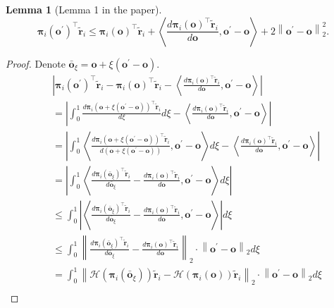 \documentclass[10pt]{article}
\def\rvo{{\mathbf{o}}}
\def\rvo{{\mathbf{o}}}
\def\rvtilder{{\tilde{\mathbf{r}}}}
\newtheorem{lem}{Lemma}
\def\rvpi{{\boldsymbol{\pi}}}
\def\gH{{\mathcal{H}}}
\begin{document}
\begin{lem}[Lemma 1 in the paper]
\label{lem:logit_smoothness}
\begin{equation*}
    \rvpi_i\left( \rvo^\prime \right)^\top \rvtilder_i \le \rvpi_i\left( \rvo \right)^\top \rvtilder_i + \left\langle \frac{d \rvpi_i\left( \rvo \right)^\top \rvtilder_i}{d \rvo}, \rvo^\prime - \rvo \right\rangle + 2 \left\| \rvo^\prime - \rvo \right\|_2^2.
\end{equation*}
\end{lem}
\begin{proof}
Denote $\bar{\rvo}_{\xi} = \rvo + \xi \left( \rvo^\prime - \rvo \right)$.
\begin{equation*}
\begin{split}
    &\left| \rvpi_i\left( \rvo^\prime \right)^\top \rvtilder_i - \rvpi_i\left( \rvo \right)^\top \rvtilder_i - \left\langle \frac{d \rvpi_i\left( \rvo \right)^\top \rvtilder_i}{d \rvo}, \rvo^\prime - \rvo \right\rangle \right| \\
    &= \left| \int_0^1{ \frac{d \rvpi_i\left( \rvo + \xi \left( \rvo^\prime - \rvo \right) \right)^\top \rvtilder_i}{d \xi} d\xi} - \left\langle \frac{d \rvpi_i\left( \rvo \right)^\top \rvtilder_i}{d \rvo}, \rvo^\prime - \rvo \right\rangle \right| \\
    &= \left| \int_0^1{ \left\langle \frac{d \rvpi_i\left( \rvo + \xi \left( \rvo^\prime - \rvo \right) \right)^\top \rvtilder_i}{d \left( \rvo + \xi \left( \rvo^\prime - \rvo \right) \right)}, \rvo^\prime - \rvo \right\rangle d\xi} - \left\langle \frac{d \rvpi_i\left( \rvo \right)^\top \rvtilder_i}{d \rvo}, \rvo^\prime - \rvo \right\rangle \right| \\
    &= \left| \int_0^1{ \left\langle \frac{d \rvpi_i\left( \bar{\rvo}_{\xi} \right)^\top \rvtilder_i}{d \bar{\rvo}_{\xi}} - \frac{d \rvpi_i\left( \rvo \right)^\top \rvtilder_i}{d \rvo}, \rvo^\prime - \rvo \right\rangle d\xi} \right| \\
    &\le \int_0^1{ \left| \left\langle \frac{d \rvpi_i\left( \bar{\rvo}_{\xi} \right)^\top \rvtilder_i}{d \bar{\rvo}_{\xi}} - \frac{d \rvpi_i\left( \rvo \right)^\top \rvtilder_i}{d \rvo}, \rvo^\prime - \rvo \right\rangle \right| d\xi} \\
    &\le \int_0^1{ \left\| \frac{d \rvpi_i\left( \bar{\rvo}_{\xi} \right)^\top \rvtilder_i}{d \bar{\rvo}_{\xi}} - \frac{d \rvpi_i\left( \rvo \right)^\top \rvtilder_i}{d \rvo} \right\|_2 \cdot \left\| \rvo^\prime - \rvo \right\|_2 d\xi} \\
    &= \int_0^1{ \left\| \gH\left( \rvpi_i\left( \bar{\rvo}_{\xi} \right)\right) \rvtilder_i - \gH\left( \rvpi_i\left( \rvo \right)\right) \rvtilder_i \right\|_2 \cdot \left\| \rvo^\prime - \rvo \right\|_2 d\xi} \\

\end{split}
\end{equation*}
\end{proof}
\end{document}

